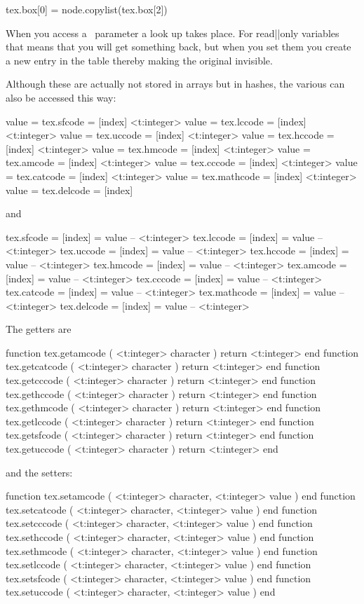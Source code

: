 \starttyping
tex.box[0] = node.copylist(tex.box[2])
\stoptyping

When you access a \TEX\ parameter a look up takes place. For read||only variables
that means that you will get something back, but when you set them you create a
new entry in the table thereby making the original invisible.

Although these are actually not stored in arrays but in hashes, the various
 can also be accessed this way:

 value = tex.sfcode   = [index]
<t:integer> value = tex.lccode   = [index]
<t:integer> value = tex.uccode   = [index]
<t:integer> value = tex.hccode   = [index]
<t:integer> value = tex.hmcode   = [index]
<t:integer> value = tex.amcode   = [index]
<t:integer> value = tex.cccode   = [index]
<t:integer> value = tex.catcode  = [index]
<t:integer> value = tex.mathcode = [index]
<t:integer> value = tex.delcode  = [index]
\stoptyping

and

\starttyping[option=LUA]
tex.sfcode   = [index] = value -- <t:integer>
tex.lccode   = [index] = value -- <t:integer>
tex.uccode   = [index] = value -- <t:integer>
tex.hccode   = [index] = value -- <t:integer>
tex.hmcode   = [index] = value -- <t:integer>
tex.amcode   = [index] = value -- <t:integer>
tex.cccode   = [index] = value -- <t:integer>
tex.catcode  = [index] = value -- <t:integer>
tex.mathcode = [index] = value -- <t:integer>
tex.delcode  = [index] = value -- <t:integer>
\stoptyping

The getters are

\starttyping[option=LUA]
function tex.getamcode  ( <t:integer> character ) return <t:integer> end
function tex.getcatcode ( <t:integer> character ) return <t:integer> end
function tex.getcccode  ( <t:integer> character ) return <t:integer> end
function tex.gethccode  ( <t:integer> character ) return <t:integer> end
function tex.gethmcode  ( <t:integer> character ) return <t:integer> end
function tex.getlccode  ( <t:integer> character ) return <t:integer> end
function tex.getsfcode  ( <t:integer> character ) return <t:integer> end
function tex.getuccode  ( <t:integer> character ) return <t:integer> end
\stoptyping

and the setters:

\starttyping[option=LUA]
function tex.setamcode  ( <t:integer> character, <t:integer> value ) end
function tex.setcatcode ( <t:integer> character, <t:integer> value ) end
function tex.setcccode  ( <t:integer> character, <t:integer> value ) end
function tex.sethccode  ( <t:integer> character, <t:integer> value ) end
function tex.sethmcode  ( <t:integer> character, <t:integer> value ) end
function tex.setlccode  ( <t:integer> character, <t:integer> value ) end
function tex.setsfcode  ( <t:integer> character, <t:integer> value ) end
function tex.setuccode  ( <t:integer> character, <t:integer> value ) end
\stoptyping

